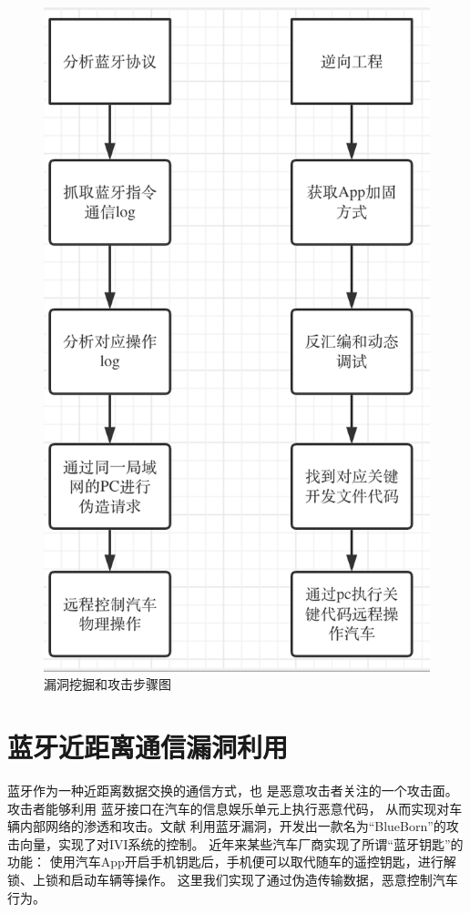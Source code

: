 \begin{figure}
  \centering
  \includegraphics[scale=0.5]{resources/img/i23.png}
  \caption{漏洞挖掘和攻击步骤图}
\end{figure}
\newline
\section {蓝牙近距离通信漏洞利用}
蓝牙作为一种近距离数据交换的通信方式，也
是恶意攻击者关注的一个攻击面。攻击者能够利用
蓝牙接口在汽车的信息娱乐单元上执行恶意代码，
从而实现对车辆内部网络的渗透和攻击。文献\cite{antian}
利用蓝牙漏洞，开发出一款名为“BlueBorn”的攻
击向量，实现了对IVI系统的控制。
近年来某些汽车厂商实现了所谓“蓝牙钥匙”的功能：
使用汽车App开启手机钥匙后，手机便可以取代随车的遥控钥匙，进行解锁、上锁和启动车辆等操作。
这里我们实现了通过伪造传输数据，恶意控制汽车行为。

